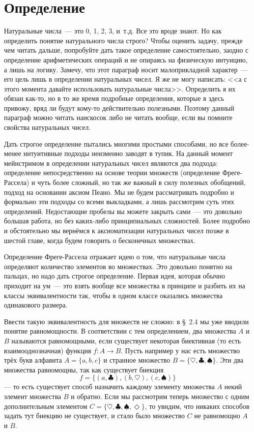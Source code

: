 \section{Определение}

Натуральные числа~--- это 0, 1, 2, 3, и~т.д. Все это вроде знают. Но как определить понятие натурального числа строго? Чтобы оценить задачу, прежде чем читать дальше, попробуйте дать такое определение самостоятельно, заодно с определение арифметических операций и не опираясь на физическую интуицию, а лишь на логику. Замечу, что этот параграф носит малоприкладной характер~--- его цель лишь в определении натуральных чисел. Я же не могу написать: <<а с этого момента давайте использовать натуральные числа>>. Определить я их обязан как-то, но в то же время подробные определения, которые я здесь привожу, вряд ли будут кому-то действительно полезными. Поэтому данный параграф можно читать наискосок либо не читать вообще, если вы помните свойства натуральных чисел.

Дать строгое определение пытались многими простыми способами, но все более-менее интуитивные подходы неизменно заводят в тупик. На данный момент мейнстримом в определении натуральных чисел являются два подхода: определение непосредственно на основе теории множеств (определение Фреге-Рассела) и чуть более сложный, но так же важный в силу полезных обобщений, подход на основании аксиом Пеано. Мы не будем рассматривать подробно и формально эти подходы со всеми выкладками, а лишь рассмотрим суть этих определений. Недостающие пробелы вы можете закрыть сами~--- это довольно большая работа, но без каких-либо принципиальных сложностей. Более подробно и обстоятельно мы вернёмся к аксиоматизации натуральных чисел позже в шестой главе, когда будем говорить о бесконечных множествах.

Определение Фреге-Рассела отражает идею о том, что натуральные числа определяют количество элементов во множествах. Это довольно понятно на пальцах, но надо дать строгое определение. Первая идея, которая обычно приходит на ум~--- это взять вообще все множества в принципе и разбить их на классы эквивалентности так, чтобы в одном классе оказались множества одинакового размера.

Ввести такую эквивалентность для множеств не сложно: в \S~2.4 мы уже вводили понятие равномощности. В соответствии с тем определением, два множества $A$ и $B$ называются равномощными, если существует некоторая биективная (то есть взаимооднозначная) функция $f:A\to B$. Пусть например у нас есть множество трёх букв алфавита $A=\{a, b, c\}$ и странное множество $B=\{\heartsuit, \clubsuit, \spadesuit\}$. Эти два множества равномощны, так как существует биекция $$f=\{(a, \clubsuit), (b, \heartsuit), (c, \spadesuit)\}$$ --- то есть существует способ назначить каждому элементу множества $A$ некий элемент множества $B$ и обратно. Если мы рассмотрим теперь множество с одним дополнительным элементом $C=\{\heartsuit, \clubsuit, \spadesuit, \Diamond\}$, то увидим, что никаких способов задать тут биекцию не существует, и стало было множество $C$ не равномощно $A$ и $B$.

